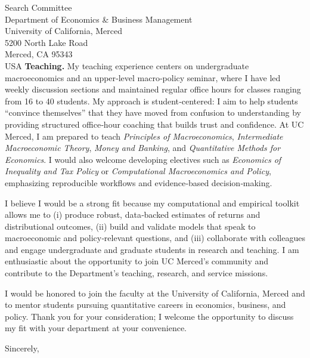 \documentclass[11pt,letterpaper]{letter}
\begin{document}
\begin{letter}{Search Committee \\
Department of Economics \& Business Management \\
University of California, Merced \\
5200 North Lake Road \\
Merced, CA 95343 \\ USA}
\textbf{Teaching.} My teaching experience centers on undergraduate macroeconomics and an upper‐level macro‐policy seminar, where I have led weekly discussion sections and maintained regular office hours for classes ranging from 16 to 40 students. My approach is student‐centered: I aim to help students “convince themselves” that they have moved from confusion to understanding by providing structured office‐hour coaching that builds trust and confidence. At UC Merced, I am prepared to teach \textit{Principles of Macroeconomics}, \textit{Intermediate Macroeconomic Theory}, \textit{Money and Banking}, and \textit{Quantitative Methods for Economics}. I would also welcome developing electives such as \textit{Economics of Inequality and Tax Policy} or \textit{Computational Macroeconomics and Policy}, emphasizing reproducible workflows and evidence‐based decision‐making.

I believe I would be a strong fit because my computational and empirical toolkit allows me to (i) produce robust, data‐backed estimates of returns and distributional outcomes, (ii) build and validate models that speak to macroeconomic and policy‐relevant questions, and (iii) collaborate with colleagues and engage undergraduate and graduate students in research and teaching. I am enthusiastic about the opportunity to join UC Merced’s community and contribute to the Department’s teaching, research, and service missions.

I would be honored to join the faculty at the University of California, Merced and to mentor students pursuing quantitative careers in economics, business, and policy. Thank you for your consideration; I welcome the opportunity to discuss my fit with your department at your convenience.

\closing{Sincerely,}

\end{letter}
\end{document}
